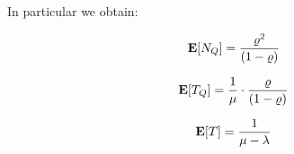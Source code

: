 In particular we obtain:

\begin{equation}
\label{eqn:M-M-1-Queue-Jobs}
\expected{N_{Q}} = \frac{\varrho^{2}}{(1-\varrho)}
\end{equation}

\begin{equation}
\label{eqn:M-M-1-Delay}
\expected{T_{Q}} = \frac{1}{\mu} \cdot \frac{\varrho}{(1-\varrho)}
\end{equation}

\begin{equation}
\label{eqn:M-M-1-Response-Time}
\expected{T} = \frac{1}{\mu - \lambda}
\end{equation}
